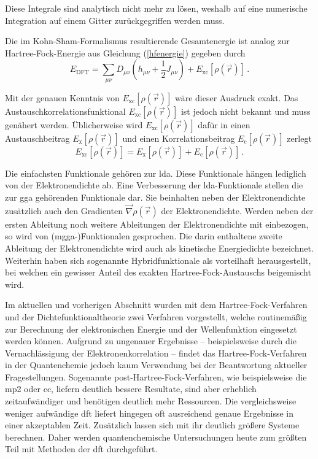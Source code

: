 Diese Integrale sind analytisch nicht mehr zu lösen, weshalb auf eine numerische Integration auf einem Gitter zurückgegriffen werden muss. 

Die im Kohn-Sham-Formalismus resultierende Gesamtenergie ist analog zur Hartree-Fock-Energie aus Gleichung (\ref{hfenergie}) gegeben durch
\begin{equation}
E_{\textrm{DFT}}=\sum_{\mu\nu}D_{\mu\nu}(h_{\mu\nu}+\frac{1}{2}J_{\mu\nu})+E_{\textrm{xc}}[\rho(\vec{r})]\, . 
\label{dftenergie}
\end{equation}

Mit der genauen Kenntnis von $E_{\textrm{xc}}[\rho(\vec{r})]$ wäre dieser Ausdruck exakt. Das Austauschkorrelationsfunktional $E_{\textrm{xc}}[\rho(\vec{r})]$ ist jedoch nicht bekannt und muss genähert werden. Üblicherweise wird $E_{\textrm{xc}}[\rho(\vec{r})]$ dafür in einen Austauschbeitrag $E_{\textrm{x}}[\rho(\vec{r})]$ und einen Korrelationsbeitrag $E_{\textrm{c}}[\rho(\vec{r})]$ zerlegt
\begin{equation}
E_{\textrm{xc}}[\rho(\vec{r})] = E_{\textrm{x}}[\rho(\vec{r})] + E_{\textrm{c}}[\rho(\vec{r})]\, .
\end{equation}

Die einfachsten Funktionale gehören zur \ac{lda}. Diese Funktionale hängen lediglich von der Elektronendichte ab. Eine Verbesserung der \ac{lda}-Funktionale stellen die zur \ac{gga} gehörenden Funktionale dar. Sie beinhalten neben der Elektronendichte zusätzlich auch den Gradienten $\vec{\nabla}\rho(\vec{r})$ der Elektronendichte. Werden neben der ersten Ableitung noch weitere Ableitungen der Elektronendichte mit einbezogen, so wird von \mbox{(\acs{mgga}-)}Funktionalen gesprochen. Die darin enthaltene zweite Ableitung der Elektronendichte wird auch als kinetische Energiedichte bezeichnet. Weiterhin haben sich sogenannte Hybridfunktionale als vorteilhaft herausgestellt, bei welchen ein gewisser Anteil des exakten Hartree-Fock-Austauschs beigemischt wird.


\bigskip
Im aktuellen und vorherigen Abschnitt wurden mit dem Hartree-Fock-Verfahren und der Dichtefunktionaltheorie zwei Verfahren vorgestellt, welche routinemäßig zur Berechnung der elektronischen Energie und der Wellenfunktion eingesetzt werden können. Aufgrund zu ungenauer Ergebnisse -- beispielsweise durch die Vernachlässigung der Elektronenkorrelation -- findet das Hartree-Fock-Verfahren in der Quantenchemie jedoch kaum Verwendung bei der Beantwortung aktueller Fragestellungen. Sogenannte post-Hartree-Fock-Verfahren, wie beispielsweise die \acl{mp2} oder \acl{cc}, liefern deutlich bessere Resultate, sind aber erheblich zeitaufwändiger und benötigen deutlich mehr Ressourcen. Die vergleichsweise weniger aufwändige \ac{dft} liefert hingegen oft ausreichend genaue Ergebnisse in einer akzeptablen Zeit. Zusätzlich lassen sich mit ihr deutlich größere Systeme berechnen. Daher werden quantenchemische Untersuchungen heute zum größten Teil mit Methoden der \ac{dft} durchgeführt. 

